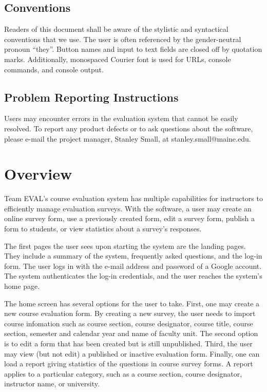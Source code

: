 \documentclass{article}
\begin{document}
\subsection{Conventions}

Readers of this document shall be aware of the stylistic and syntactical conventions that we use. The user is often referenced by the gender-neutral pronoun ``they''. Button names and input to text fields are closed off by quotation marks. Additionally, monospaced Courier font is used for URLs, console commands, and console output.

\subsection{Problem Reporting Instructions}

Users may encounter errors in the evaluation system that cannot be easily resolved. To report any product defects or to ask questions about the software, please e-mail the project manager, Stanley Small, at stanley.small@maine.edu.

\section{Overview}

Team EVAL's course evaluation system has multiple capabilities for instructors to efficiently manage evaluation surveys. With the software, a user may create an online survey form, use a previously created form, edit a survey form, publish a form to students, or view statistics about a survey's responses.

The first pages the user sees upon starting the system are the landing pages. They include a summary of the system, frequently asked questions, and the log-in form. The user logs in with the e-mail address and password of a Google account. The system authenticates the log-in credentials, and the user reaches the system's home page.

The home screen has several options for the user to take. First, one may create a new course evaluation form. By creating a new survey, the user needs to import course infomation such as course section, course designator, course title, course section, semester and calendar year and name of faculty unit. The second option is to edit a form that has been created but is still unpublished. Third, the user may view (but not edit) a published or inactive evaluation form. Finally, one can load a report giving statistics of the questions in course survey forms. A report applies to a particular category, such as a course section, course designator, instructor name, or university.
\end{document}
